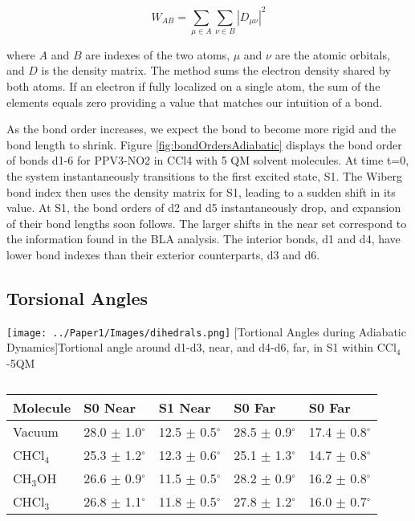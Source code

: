     \begin{equation}
    W_{AB} = \sum_{\mu\in A}\sum_{\nu \in B} | D_{\mu\nu} |^2
    \end{equation}

    where \(A\) and \(B\) are indexes of the two atoms, \(\mu\) and \(\nu\) are the atomic orbitals, and \(D\) is the density matrix.
    The method sums the electron density shared by both atoms.
    If an electron if fully localized on a single atom, the sum of the elements equals zero providing a value that matches our intuition of a bond. 

    As the bond order increases, we expect the bond to become more rigid and the bond length to shrink.
    Figure \ref{fig:bondOrdersAdiabatic} displays the bond order of bonds d1-6 for PPV3-NO2 in CCl4 with 5 QM solvent molecules.
    At time t=0, the system instantaneously transitions to the first excited state, S1.
    The Wiberg bond index then uses the density matrix for S1, leading to a sudden shift in its value.
    At S1, the bond orders of d2 and d5 instantaneously drop, and expansion of their bond lengths soon follows.
    The larger shifts in the near set correspond to the information found in the BLA analysis.
    The interior bonds, d1 and d4, have lower bond indexes than their exterior counterparts, d3 and d6.

\subsection{Torsional Angles}

\noindent
\begin{minipage}[c]{\textwidth}
  \centering
  \texttt{[image: ../Paper1/Images/dihedrals.png]}
  [Tortional Angles during Adiabatic Dynamics]{Tortional angle around d1-d3, near, and d4-d6, far, in S1 within CCl\(_4\)-5QM}
  \label{dihedralAdiabatic}
\end{minipage}\bigskip

\begin{table}[H]
  \caption[]{}
  \begin{tabularx}{\textwidth}{XXXXX}\hline
    Molecule    & S0 Near  & S1 Near & S0 Far & S0 Far\\\hline
    Vacuum      & 28.0 \(\pm\) 1.0\(^\circ\) & 12.5 \(\pm\) 0.5\(^\circ\) & 28.5 \(\pm\) 0.9\(^\circ\) & 17.4 \(\pm\) 0.8\(^\circ\)\\
    CHCl\(_4\)  & 25.3 \(\pm\) 1.2\(^\circ\)  & 12.3 \(\pm\) 0.6\(^\circ\) & 25.1 \(\pm\) 1.3\(^\circ\) & 14.7 \(\pm\) 0.8\(^\circ\)\\
    CH\(_3\)OH  & 26.6 \(\pm\) 0.9\(^\circ\)  & 11.5 \(\pm\) 0.5\(^\circ\) & 28.2 \(\pm\) 0.9\(^\circ\) & 16.2 \(\pm\) 0.8\(^\circ\)\\
    CHCl\(_3\)  & 26.8 \(\pm\) 1.1\(^\circ\)  & 11.8 \(\pm\) 0.5\(^\circ\) & 27.8 \(\pm\) 1.2\(^\circ\) & 16.0 \(\pm\) 0.7\(^\circ\)\\\hline
  \end{tabularx}
\end{table}

